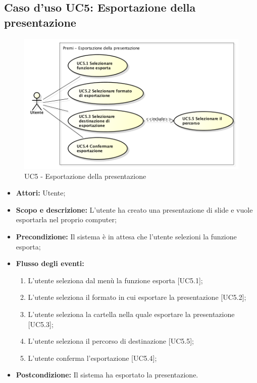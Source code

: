 \subsection{Caso d'uso UC5: Esportazione della presentazione}
	\begin{figure}[h]
		\centering
		\includegraphics[scale=0.45] {img/UC5.png}
		\caption{UC5 - Esportazione della presentazione}
	\end{figure}

	\begin{itemize}
		\item \textbf{Attori:} Utente;
		\item \textbf{Scopo e descrizione:} L'utente ha creato una presentazione di slide e vuole esportarla nel proprio computer;
		\item \textbf{Precondizione:} Il sistema è in attesa che l'utente selezioni la funzione esporta;
		\item \textbf{Flusso degli eventi:}
		\begin{enumerate}
			\item L'utente seleziona dal menù la funzione esporta [UC5.1];
			\item L'utente seleziona il formato in cui esportare la presentazione [UC5.2];
			\item L'utente seleziona la cartella nella quale esportare la presentazione [UC5.3];
			\item L'utente seleziona il percorso di destinazione [UC5.5];
			\item L'utente conferma l'esportazione [UC5.4];
		\end{enumerate}
		\item \textbf{Postcondizione:} Il sistema ha esportato la presentazione.
	\end{itemize}


